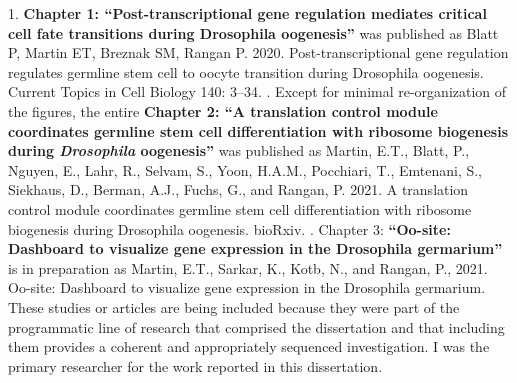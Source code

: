 \documentclass[12pt,oneside]{reedthesis}
\begin{document}
  \begin{attribution}
  \pagestyle{plain}
    1. \textbf{Chapter 1: ``Post-transcriptional gene regulation mediates critical cell fate transitions during Drosophila oogenesis''} was published as Blatt P, Martin ET, Breznak SM, Rangan P. 2020. {Post-transcriptional gene regulation regulates germline} {stem cell to oocyte transition during Drosophila oogenesis.} Current Topics in Cell Biology 140: 3--34.
    \newline {}. Except for minimal re-organization of the figures, the entire \textbf{Chapter 2: ``A translation control module coordinates germline stem cell differentiation with ribosome biogenesis during \emph{Drosophila} oogenesis''} was published as Martin, E.T., Blatt, P., Nguyen, E., Lahr, R., Selvam, S., Yoon, H.A.M., Pocchiari, T., Emtenani, S., Siekhaus, D., Berman, A.J., Fuchs, G., and Rangan, P. 2021. {A translation control module coordinates germline stem cell differentiation with} {ribosome biogenesis during Drosophila oogenesis.} bioRxiv.
    \newline {}. Chapter 3: \textbf{``Oo-site: Dashboard to visualize gene expression in the Drosophila germarium''} is in preparation as Martin, E.T., Sarkar, K., Kotb, N., and Rangan, P., 2021. {Oo-site: Dashboard to visualize gene expression in the Drosophila} {germarium.}
    \newline \newline
    These studies or articles are being included because they were part of the programmatic line of research that comprised the dissertation and that including them provides a coherent and appropriately sequenced investigation.
    \newline \newline
    I was the primary researcher for the work reported in this dissertation.
  \end{attribution}
  \hypersetup{linkcolor=black}
  \setcounter{secnumdepth}{2}
  \setcounter{tocdepth}{2}
  \pagestyle{plain}
  \tableofcontents


  \listoffigures
  \pagestyle{plain}

\mainmatter %
\pagestyle{plain} %

\end{document}
